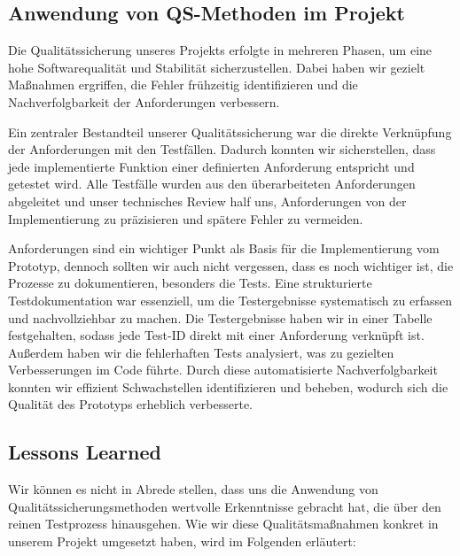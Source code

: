 \subsection{Anwendung von QS-Methoden im Projekt}\label{subsec: anwendung-von-qs-methoden-im-projekt}

Die Qualitätssicherung unseres Projekts erfolgte in mehreren Phasen, um eine hohe Softwarequalität und Stabilität sicherzustellen. 
Dabei haben wir gezielt Maßnahmen ergriffen, die Fehler frühzeitig identifizieren und die Nachverfolgbarkeit der Anforderungen verbessern.

Ein zentraler Bestandteil unserer Qualitätssicherung war die direkte Verknüpfung der Anforderungen mit den Testfällen.
Dadurch konnten wir sicherstellen, dass jede implementierte Funktion einer definierten Anforderung entspricht und getestet wird.
Alle Testfälle wurden aus den überarbeiteten Anforderungen abgeleitet und unser technisches Review half uns, Anforderungen von der Implementierung zu präzisieren und spätere Fehler zu vermeiden.

Anforderungen sind ein wichtiger Punkt als Basis für die Implementierung vom Prototyp, dennoch sollten wir auch nicht vergessen, dass es noch wichtiger ist, die Prozesse zu dokumentieren, besonders die Tests. 
Eine strukturierte Testdokumentation war essenziell, um die Testergebnisse systematisch zu erfassen und nachvollziehbar zu machen.
Die Testergebnisse haben wir in einer Tabelle festgehalten, sodass jede Test-ID direkt mit einer Anforderung verknüpft ist.
Außerdem haben wir die fehlerhaften Tests analysiert, was zu gezielten Verbesserungen im Code führte.
Durch diese automatisierte Nachverfolgbarkeit konnten wir effizient Schwachstellen identifizieren und beheben, wodurch sich die Qualität des Prototyps erheblich verbesserte.

\subsection{Lessons Learned}\label{subsec:lessons-learned}

Wir können es nicht in Abrede stellen, dass uns die Anwendung von Qualitätssicherungsmethoden wertvolle Erkenntnisse gebracht hat, die über den reinen Testprozess hinausgehen.
Wie wir diese Qualitätsmaßnahmen konkret in unserem Projekt umgesetzt haben, wird im Folgenden erläutert:


